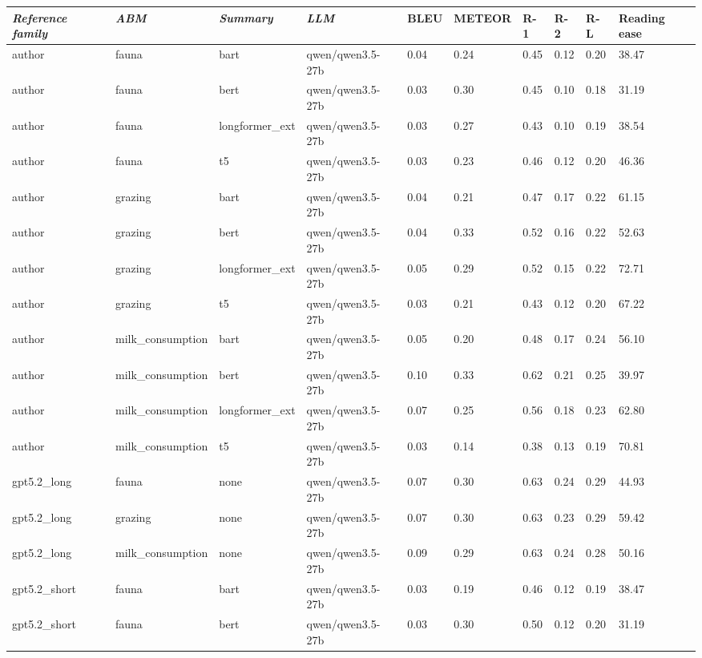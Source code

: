 \begin{tabular}{|l|l|l|l|l|l|l|l|l|l|}
\hline
\textit{\textbf{Reference family}} & \textit{\textbf{ABM}} & \textit{\textbf{Summary}} & \textit{\textbf{LLM}} & BLEU & METEOR & R-1 & R-2 & R-L & Reading ease \\
 \hline
 author & fauna & bart & qwen/qwen3.5-27b & 0.04 & 0.24 & 0.45 & 0.12 & 0.20 & 38.47 \\
 \hline
 author & fauna & bert & qwen/qwen3.5-27b & 0.03 & 0.30 & 0.45 & 0.10 & 0.18 & 31.19 \\
 \hline
 author & fauna & longformer\_ext & qwen/qwen3.5-27b & 0.03 & 0.27 & 0.43 & 0.10 & 0.19 & 38.54 \\
 \hline
 author & fauna & t5 & qwen/qwen3.5-27b & 0.03 & 0.23 & 0.46 & 0.12 & 0.20 & 46.36 \\
 \hline
 author & grazing & bart & qwen/qwen3.5-27b & 0.04 & 0.21 & 0.47 & 0.17 & 0.22 & 61.15 \\
 \hline
 author & grazing & bert & qwen/qwen3.5-27b & 0.04 & 0.33 & 0.52 & 0.16 & 0.22 & 52.63 \\
 \hline
 author & grazing & longformer\_ext & qwen/qwen3.5-27b & 0.05 & 0.29 & 0.52 & 0.15 & 0.22 & 72.71 \\
 \hline
 author & grazing & t5 & qwen/qwen3.5-27b & 0.03 & 0.21 & 0.43 & 0.12 & 0.20 & 67.22 \\
 \hline
 author & milk\_consumption & bart & qwen/qwen3.5-27b & 0.05 & 0.20 & 0.48 & 0.17 & 0.24 & 56.10 \\
 \hline
 author & milk\_consumption & bert & qwen/qwen3.5-27b & 0.10 & 0.33 & 0.62 & 0.21 & 0.25 & 39.97 \\
 \hline
 author & milk\_consumption & longformer\_ext & qwen/qwen3.5-27b & 0.07 & 0.25 & 0.56 & 0.18 & 0.23 & 62.80 \\
 \hline
 author & milk\_consumption & t5 & qwen/qwen3.5-27b & 0.03 & 0.14 & 0.38 & 0.13 & 0.19 & 70.81 \\
 \hline
 gpt5.2\_long & fauna & none & qwen/qwen3.5-27b & 0.07 & 0.30 & 0.63 & 0.24 & 0.29 & 44.93 \\
 \hline
 gpt5.2\_long & grazing & none & qwen/qwen3.5-27b & 0.07 & 0.30 & 0.63 & 0.23 & 0.29 & 59.42 \\
 \hline
 gpt5.2\_long & milk\_consumption & none & qwen/qwen3.5-27b & 0.09 & 0.29 & 0.63 & 0.24 & 0.28 & 50.16 \\
 \hline
 gpt5.2\_short & fauna & bart & qwen/qwen3.5-27b & 0.03 & 0.19 & 0.46 & 0.12 & 0.19 & 38.47 \\
 \hline
 gpt5.2\_short & fauna & bert & qwen/qwen3.5-27b & 0.03 & 0.30 & 0.50 & 0.12 & 0.20 & 31.19 \\

\end{tabular}
